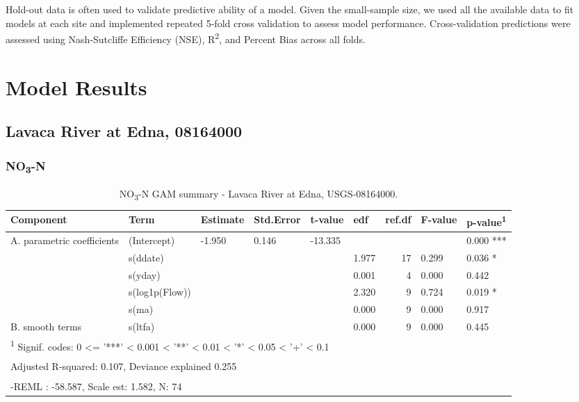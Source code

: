 \documentclass[
]{article}
\newenvironment{widestuff}{\begin{table}[h]\begin{adjustwidth}{-4.5cm}{-4.5cm}\centering}{\end{adjustwidth}\end{table}}
\begin{document}
Hold-out data is often used to validate predictive ability of a model.
Given the small-sample size, we used all the available data to fit
models at each site and implemented repeated 5-fold cross validation to
assess model performance. Cross-validation predictions were assessed
using Nash-Sutcliffe Efficiency (NSE), R\textsuperscript{2}, and Percent
Bias across all folds.

\hypertarget{model-results}{%
\section{Model Results}\label{model-results}}

\hypertarget{lavaca-river-at-edna-08164000}{%
\subsection{Lavaca River at Edna,
08164000}\label{lavaca-river-at-edna-08164000}}

\hypertarget{no3-n}{%
\subsubsection{\texorpdfstring{NO\textsubscript{3}-N}{NO3-N}}\label{no3-n}}

\begin{widestuff}

\caption{NO\textsubscript{3}-N GAM summary - Lavaca River at Edna, USGS-08164000.}
\centering
\begin{tabular}[t]{llllllrll}
\toprule
Component & Term & Estimate & Std.Error & t-value & edf & ref.df & F-value & p-value\textsuperscript{1}\\
\midrule
A. parametric coefficients & (Intercept) & -1.950 & 0.146 & -13.335 &  &  &  & 0.000 ***\\
\cmidrule{1-9}
 & s(ddate) &  &  &  & 1.977 & 17 & 0.299 & 0.036 *\\

 & s(yday) &  &  &  & 0.001 & 4 & 0.000 & 0.442\\

 & s(log1p(Flow)) &  &  &  & 2.320 & 9 & 0.724 & 0.019 *\\

 & s(ma) &  &  &  & 0.000 & 9 & 0.000 & 0.917\\

\multirow[t]{-5}{*}{\raggedright\arraybackslash B. smooth terms} & s(ltfa) &  &  &  & 0.000 & 9 & 0.000 & 0.445\\
\bottomrule
\multicolumn{9}{l}{\textsuperscript{1} Signif. codes: 0 <= '***' < 0.001 < '**' < 0.01 < '*' < 0.05 < '+' < 0.1}\\
\multicolumn{9}{l}{\textsuperscript{} Adjusted R-squared: 0.107, Deviance explained 0.255}\\
\multicolumn{9}{l}{\textsuperscript{} -REML : -58.587, Scale est: 1.582, N: 74}\\
\end{tabular}
\end{widestuff}
\end{document}
